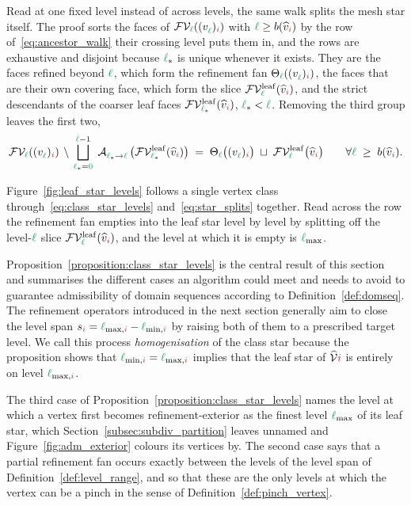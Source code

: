 \documentclass[a4paper, 12pt]{article}
\newcommand{\lminIdx}[1]{\l_{\min,#1}}
\newcommand{\lmax}{\l_{\max}}
\newcommand{\lmaxIdx}[1]{\l_{\max,#1}}
\newcommand{\levelSpan}[1]{s_{#1}}
\newcommand{\lstar}{\l_{\ast}}
\newcommand{\green}{\color{ForestGreen}}
\newcommand{\brickred}{\color{BrickRed}}
\newcommand{\V}{\mathcal{V}}
\newcommand{\F}{\mathcal{F}}
\newcommand{\vertex}[2]{\freeQ{v}{}{#1}{#2}}
\newcommand{\vertexClass}[1]{\widehat{v}_{#1}}
\newcommand{\vertexClasses}{\widehat{\V}}
\newcommand{\FVl}[1]{\F\V_{#1}}
\newcommand{\coarseIdxone}{{\brickred i}}
\renewcommand{\l}{{\green\ell}}
\newcommand{\lzero}{{\green 0}}
\newcommand{\freeQ}[4]{ ( {#1}^{#2}_{#3} )_{#4}}
\newcommand{\Aop}[3]{\mathcal{A}^{#1}_{{#2} \to {#3}}}
\theoremstyle{definition}
\theoremstyle{plain}
\numberwithin{equation}{section}
\newcommand{\refFan}[1]{\Theta_{#1}}                        %
\newcommand{\birthLevel}{b}
\newcommand{\FVleaf}[1]{\F\V^{\mathrm{leaf}}_{#1}}          %
\begin{document}
Read at one fixed level instead of across levels, the same walk splits the mesh star itself. The proof sorts the faces of $\FVl{\l}(\vertex{\l}{\coarseIdxone})$ with $\l \geq \birthLevel(\vertexClass{\coarseIdxone})$ by the row of~\eqref{eq:ancestor_walk} their crossing level puts them in, and the rows are exhaustive and disjoint because $\lstar$ is unique whenever it exists. They are the faces refined beyond $\l$, which form the refinement fan $\refFan{\l}(\vertex{\l}{\coarseIdxone})$, the faces that are their own covering face, which form the slice $\FVleaf{\l}(\vertexClass{\coarseIdxone})$, and the strict descendants of the coarser leaf faces $\FVleaf{\lstar}(\vertexClass{\coarseIdxone})$, $\lstar < \l$. Removing the third group leaves the first two,
\begin{equation}
    \label{eq:star_splits}
    \FVl{\l}(\vertex{\l}{\coarseIdxone}) \, \setminus \, \bigsqcup\limits_{\lstar = \lzero}^{\l-1} \; \Aop{}{\lstar}{\l} \, \big( \FVleaf{\lstar} (\vertexClass{\coarseIdxone}) \big) \; = \; \refFan{\l} \big( \vertex{\l}{\coarseIdxone} \big) \; \sqcup \;  \FVleaf{\l} \big( \vertexClass{\coarseIdxone} \big) \qquad \forall \l \; \geq \; \birthLevel(\vertexClass{\coarseIdxone}) .
\end{equation}

Figure~\ref{fig:leaf_star_levels} follows a single vertex class through~\eqref{eq:class_star_levels} and~\eqref{eq:star_splits} together. Read across the row the refinement fan empties into the leaf star level by level by splitting off the level-$\l$ slice $\FVleaf{\l} ( \vertexClass{\coarseIdxone} )$, and the level at which it is empty is $\lmax$.

\smallskip

Proposition~\ref{proposition:class_star_levels} is the central result of this section and summarises the different cases an algorithm could meet and needs to avoid to guarantee admissibility of domain sequences according to Definition~\ref{def:domseq}. The refinement operators introduced in the next section generally aim to close the level span $\levelSpan{\coarseIdxone} = \lmaxIdx{\coarseIdxone} - \lminIdx{\coarseIdxone}$ by raising both of them to a prescribed target level. We call this process \emph{homogenisation} of the class star because the proposition shows that $\lminIdx{\coarseIdxone} = \lmaxIdx{\coarseIdxone}$ implies that the leaf star of $\vertexClasses{\coarseIdxone}$ is entirely on level $\lmaxIdx{\coarseIdxone}$.

The third case of Proposition~\ref{proposition:class_star_levels} names the level at which a vertex first becomes refinement-exterior as the finest level $\lmax$ of its leaf star, which Section~\ref{subsec:subdiv_partition} leaves unnamed and Figure~\ref{fig:adm_exterior} colours its vertices by. The second case says that a partial refinement fan occurs exactly between the levels of the level span of Definition~\ref{def:level_range}, and so that these are the only levels at which the vertex can be a pinch in the sense of Definition~\ref{def:pinch_vertex}.
\end{document}
